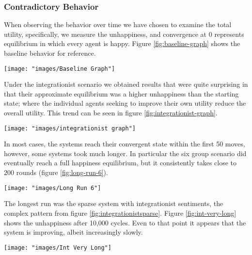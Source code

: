 \documentclass[sigplan,nonacm]{acmart}
\begin{document}
\subsubsection{Contradictory Behavior}

When observing the behavior over time we have chosen to examine the total utility, specifically,
we measure the unhappiness, and convergence at 0 represents equilibrium in which every agent is happy.
Figure \ref{fig:baseline-graph} shows the baseline behavior for reference.

\begin{figure*}
	\centering
	\texttt{[image: "images/Baseline Graph"]}
	\caption{}
	\label{fig:baseline-graph}
\end{figure*}


Under the integrationist scenario we obtained results that were quite surprising in that their approximate
equilibrium was a higher unhappiness than the starting state;
where the individual agents seeking to improve their own utility reduce the overall utility.
This trend can be seen in figure \ref{fig:integrationist-graph}.

\begin{figure*}
	\centering
	\texttt{[image: "images/integrationist graph"]}
	\caption{}
	\label{fig:integrationist-graph}
\end{figure*}

In most cases, the systems reach their convergent state within the first 50 moves, however, some systems took much longer.
In particular the six group scenario did eventually reach a full happiness equilibrium, but it consistently takes
close to 200 rounds (figure \ref{fig:long-run-6}).

\begin{figure*}
	\centering
	\texttt{[image: "images/Long Run 6"]}
	\caption{}
	\label{fig:long-run-6}
\end{figure*}

The longest run was the sparse system with integrationist sentiments, the complex pattern from figure \ref{fig:integrationistsparse}.
Figure \ref{fig:int-very-long} shows the unhappiness after 10,000 cycles. Even to that point it appears that the system is improving,
albeit increasingly slowly.

\begin{figure*}
	\centering
	\texttt{[image: "images/Int Very Long"]}
	\caption{}
	\label{fig:int-very-long}
\end{figure*}
\end{document}
